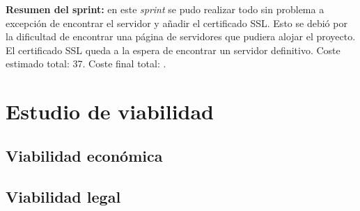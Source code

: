 \textbf{Resumen del sprint:} en este \textit{sprint} se pudo realizar todo sin problema a excepción de encontrar el servidor y añadir el certificado SSL. Esto se debió por la dificultad de encontrar una página de servidores que pudiera alojar el proyecto. El certificado SSL queda a la espera de encontrar un servidor definitivo. Coste estimado total: 37. Coste final total: .

\section{Estudio de viabilidad}

\subsection{Viabilidad económica}

\subsection{Viabilidad legal}
